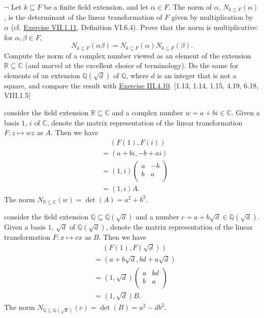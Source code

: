 \documentclass[12pt,letterpaper,boxed]{hmcpset}
\begin{document}
\hypertarget{Exercise VII.1.12}{}
\begin{problem}[1.12]
	$\neg$ Let $k \subseteq F$ be a finite field extension, and let $\alpha \in F$. The norm of $\alpha$, $N_{k \subseteq F}(\alpha)$, is the determinant of the linear transformation of $F$ given by multiplication by $\alpha$ (cf. \hyperlink{Exercise VII.1.11}{Exercise VII.1.11}, Definition VI.6.4).
	Prove that the norm is multiplicative: for $\alpha, \beta \in F$,
	$$
	N_{k \subseteq F}(\alpha \beta)=N_{k \subseteq F}(\alpha) N_{k \subseteq F}(\beta) .
	$$
	Compute the norm of a complex number viewed as an element of the extension $\mathbb{R} \subseteq \mathbb{C}$ (and marvel at the excellent choice of terminology). Do the same for elements of an extension $\mathbb{Q}(\sqrt{d})$ of $\mathbb{Q}$, where $d$ is an integer that is not a square, and compare the result with  \hyperlink{Exercise III.4.10}{Exercise III.4.10}. [1.13, 1.14, 1.15, 4.19, 6.18, VIII.1.5]
\end{problem}
\begin{solution}
	consider the field extension $\mathbb{R} \subseteq \mathbb{C}$ and a complex number $w=a+bi\in \mathbb{C}$. Given a basis $1$, $i$ of $\mathbb{C}$, denote the matrix representation of the linear transformation $F:z\mapsto wz$ as $A$. Then we have
	\begin{align*}
		&\hspace{15pt}\left(F(1),F(i)\right)\\
		&=\left(a+bi,-b+ai\right)\\
		&=\left(1,i\right)
		\begin{pmatrix}
			a&-b\\
			b&a\\
		\end{pmatrix}\\
		&=\left(1,i\right)A.
	\end{align*} 
	The norm $N_{\mathbb{R} \subseteq \mathbb{C}}(w)=\det(A)=a^2+b^2$.
	
	consider the field extension $\mathbb{Q} \subseteq \mathbb{Q}\left(\sqrt{d}\right)$ and a number $c=a+b\sqrt{d}\in \mathbb{Q}\left(\sqrt{d}\right)$. Given a basis $1$, $\sqrt{d}$ of $ \mathbb{Q}\left(\sqrt{d}\right)$, denote the matrix representation of the linear transformation $F:x\mapsto cx$ as $B$. Then we have
	\begin{align*}
		&\hspace{15pt}\left(F(1),F\left(\sqrt{d}\right)\right)\\
		&=\left(a+b\sqrt{d},bd+a\sqrt{d}\right)\\
		&=\left(1,\sqrt{d}\right)
		\begin{pmatrix}
			a&bd\\
			b&a\\
		\end{pmatrix}\\
		&=\left(1,\sqrt{d}\right)B.
	\end{align*} 
	The norm $N_{\mathbb{Q} \subseteq \mathbb{Q}(\sqrt{d})}(c)=\det(B)=a^2-db^2$.

\end{solution}
\end{document}
